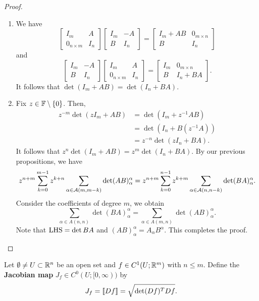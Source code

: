 \documentclass[a4paper]{article}
\begin{document}
\begin{proof}
\begin{enumerate}
\item We have 
\[
\begin{bmatrix}
  I_m & A \\
  0_{n \times m} & I_n
\end{bmatrix} 
\begin{bmatrix}
  I_m & - A \\ 
  B & I_n
\end{bmatrix}
= \begin{bmatrix}
  I_m + AB & 0_{m \times n} \\
  B & I_n
\end{bmatrix}
\]
and 
\[
\begin{bmatrix}
  I_m & -A \\
  B & I_n
\end{bmatrix}
\begin{bmatrix}
  I_m & A \\  
  0_{n \times m} & I_n 
\end{bmatrix}
= \begin{bmatrix}
  I_m & 0_{m \times n} \\
  B & I_n + BA
\end{bmatrix}.
\]
It follows that $\det(I_m + AB) = \det(I_n + BA)$.

\item Fix $z \in \mathbb{F} \setminus \left\{ 0 \right\}$. 
Then, 
\[
\begin{aligned}
  z^{-m} \det(z I_m + AB) 
  &= \det(I_m + z^{-1} AB)  \\
  &= \det(I_n + B (z^{-1} A)) \\
  &= z^{-n} \det(z I_n + BA).
\end{aligned}
\]
It follows that $z^n \det(I_m + AB) = 
z^m \det(I_n + BA)$. By our previous propositions, 
we have 
\[
z^{n+m} \sum_{k=0}^{m-1} 
z^{k+n} \sum_{\alpha \in \mathcal{A}(m, m-k)} \det(AB)_\alpha^\alpha 
= z^{n + m} \sum_{k=0}^{n-1} z^{k+m} 
\sum_{\alpha \in \mathcal{A}(n, n - k)} \det (BA)_\alpha^\alpha.
\]
Consider the coefficients of degree $m$, we obtain 
\[
\sum_{\alpha \in A(n, n)} \det(BA)_\alpha^\alpha 
= \sum_{\alpha \in A(m, n)} \det(AB)_\alpha^\alpha.
\]
Note that $\operatorname{LHS} = \det BA$ and $(AB)_\alpha^\alpha = 
A_\alpha B^\alpha$. This completes the proof.
\end{enumerate}
\end{proof}

\begin{defi}
Let $\emptyset \neq U \subset \mathbb{R}^n$ be an open set and 
$f \in C^1 (U; \mathbb{R}^m)$ with $n \leq m$. Define the 
\textbf{Jacobian map} $J_f \in C^0 (U; [0, \infty))$
by 
\[
J_f = \left\llbracket Df \right\rrbracket = \sqrt{\det (Df)^T Df}.
\]
\end{defi}
\end{document}
